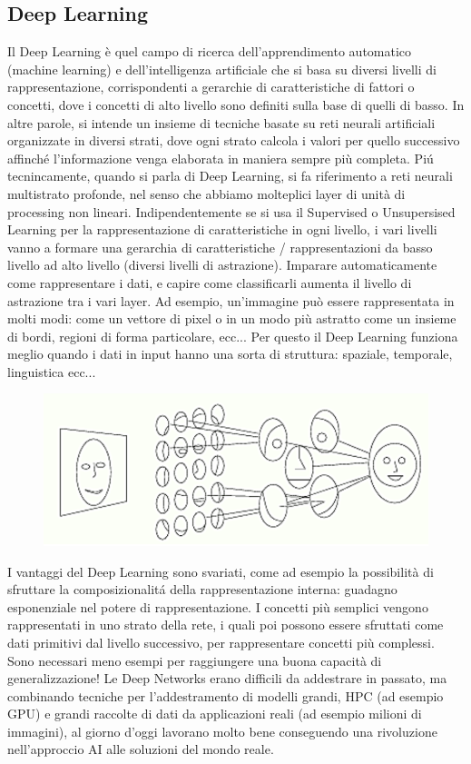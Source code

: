\documentclass{article}
\begin{document}
\subsection{Deep Learning}
Il Deep Learning è quel campo di ricerca dell'apprendimento automatico (machine learning) e dell'intelligenza artificiale che si basa su diversi livelli di rappresentazione, corrispondenti a gerarchie di caratteristiche di fattori o concetti, dove i concetti di alto livello sono definiti sulla base di quelli di basso. In altre parole, si intende un insieme di tecniche basate su reti neurali artificiali organizzate in diversi strati, dove ogni strato calcola i valori per quello successivo affinché l'informazione venga elaborata in maniera sempre più completa. \newline
Piú tecnincamente, quando si parla di Deep Learning, si fa riferimento a reti neurali multistrato profonde, nel senso che abbiamo molteplici layer di unità di processing non lineari. Indipendentemente se si usa il Supervised o Unsupersised Learning per la rappresentazione di caratteristiche in ogni livello, i vari livelli vanno a formare una gerarchia di caratteristiche / rappresentazioni da basso livello ad alto livello (diversi livelli di astrazione).
Imparare automaticamente come rappresentare i dati, e capire come classificarli aumenta il livello di astrazione tra i vari layer. Ad esempio, un'immagine può essere rappresentata in molti modi: come un vettore di pixel o in un modo più astratto come un insieme di bordi, regioni di forma particolare, ecc... Per questo il Deep Learning funziona meglio quando i dati in input hanno una sorta di struttura: spaziale, temporale, linguistica ecc...
\begin{figure}[H]
\centering
\includegraphics[scale=0.4]{Images/deeplearningimage.png}
\end{figure}
I vantaggi del Deep Learning sono svariati, come ad esempio la possibilità di sfruttare la composizionalitá della rappresentazione interna: guadagno esponenziale nel potere di rappresentazione. I concetti più semplici vengono rappresentati in uno strato della rete, i quali poi possono essere sfruttati come dati primitivi dal livello successivo, per rappresentare concetti più complessi. Sono necessari meno esempi per raggiungere una buona capacità di generalizzazione! Le Deep Networks erano difficili da addestrare in passato, ma combinando tecniche per l'addestramento di modelli grandi, HPC (ad esempio GPU) e grandi raccolte di dati da applicazioni reali (ad esempio milioni di immagini), al giorno d'oggi lavorano molto bene conseguendo una rivoluzione nell'approccio AI alle soluzioni del mondo reale.







%
%
\end{document}
